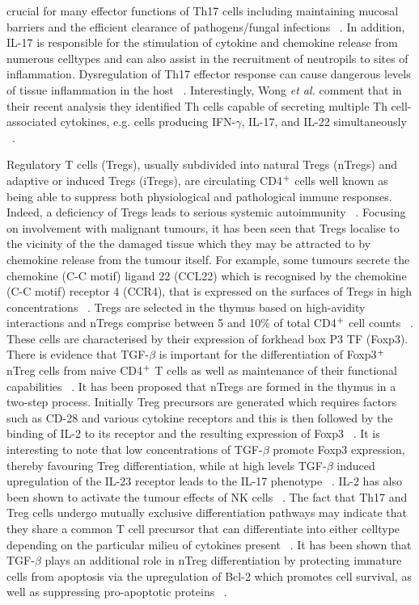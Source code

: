 crucial for many effector functions of Th17 cells including maintaining mucosal barriers and the efficient clearance of pathogens/fungal infections ~\autocite{Cro2009,Gau2015}. In addition, IL-17 is responsible for the stimulation of cytokine and chemokine release from numerous celltypes and can also assist in the recruitment of neutropils to sites of inflammation. Dysregulation of Th17 effector response can cause dangerous levels of tissue inflammation in the host ~\autocite{Awa2009}. Interestingly, Wong \textit{et al.} comment that in their recent analysis they identified Th cells capable of secreting multiple Th cell-associated cytokines, e.g. cells producing  IFN-$\gamma$, IL-17, and IL-22 simultaneously ~\autocite{Won2016}. 

Regulatory T cells (Tregs), usually subdivided into natural Tregs (nTregs) and adaptive or induced Tregs (iTregs), are circulating CD4$\textsuperscript{+}$ cells well known as being able to suppress both physiological and pathological immune responses. Indeed, a deficiency of Tregs leads to serious systemic autoimmunity ~\autocite{Sch2014}. Focusing on involvement with malignant tumours, it has been seen that Tregs localise to the vicinity of the the damaged tissue which they may be attracted to by chemokine release from the tumour itself. For example, some tumours secrete the chemokine (C-C motif) ligand 22 (CCL22) which is recognised by the chemokine (C-C motif) receptor 4 (CCR4), that is expressed on the surfaces of Tregs in high concentrations ~\autocite{Sch2014}. Tregs are selected in the thymus based on high-avidity interactions and nTregs comprise between 5 and 10\% of total CD4$\textsuperscript{+}$ cell counts ~\autocite{Sch2014}. These cells are characterised by their expression of forkhead box P3 TF (Foxp3). There is evidence that TGF-$\beta$ is important for the differentiation of Foxp3$\textsuperscript{+}$ nTreg cells from naive CD4$\textsuperscript{+}$ T cells as well as maintenance of their functional capabilities ~\autocite{Awa2009}. It has been proposed that nTregs are formed in the thymus in a two-step process. Initially Treg precursors are generated which requires factors such as CD-28 and various cytokine receptors and this is then followed by the binding of IL-2 to its receptor and the resulting expression of Foxp3 ~\autocite{Sch2014}. It is interesting to note that low concentrations of TGF-$\beta$ promote Foxp3 expression, thereby favouring Treg differentiation, while at high levels TGF-$\beta$ induced upregulation of the IL-23 receptor leads to the IL-17 phenotype ~\autocite{Sch2014}. IL-2 has also been shown to activate the tumour effects of NK cells ~\autocite{Tia2013}. The fact that Th17 and Treg cells undergo mutually exclusive differentiation pathways may indicate that they share a common T cell precursor that can differentiate into either celltype depending on the particular milieu of cytokines present ~\autocite{Awa2009}. It has been shown that TGF-$\beta$ plays an additional role in nTreg differentiation by protecting immature cells from apoptosis via the upregulation of Bcl-2 which promotes cell survival, as well as suppressing pro-apoptotic proteins ~\autocite{Sch2014}. 

